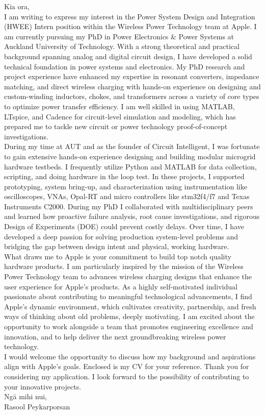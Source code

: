 \documentclass[letterpaper,11pt]{article}
\begin{document}
Kia ora, \\[15pt]
I am writing to express my interest in the Power System Design and Integration (HWEE) Intern position within the Wireless Power Technology team at Apple. I am currently pursuing my PhD in Power Electronics \& Power Systems at Auckland University of Technology. With a strong theoretical and practical background spanning analog and digital circuit design, I have developed a solid technical foundation in power systems and electronics. My PhD research and project experience have enhanced my expertise in resonant converters, impedance matching, and direct wireless charging with hands-on experience on designing and custom-winding inductors, chokes, and transformers across a variety of core types to optimize power transfer efficiency. I am well skilled in using MATLAB, LTspice, and Cadence for circuit-level simulation and modeling, which has prepared me to tackle new circuit or power technology proof-of-concept investigations. \\[10pt]

During my time at AUT and as the founder of Circuit Intelligent, I was fortunate to gain extensive hands-on experience designing and building modular microgrid hardware testbeds. I frequently utilize Python and MATLAB for data collection, scripting, and doing hardware in the loop test. In these projects, I supported prototyping, system bring-up, and characterization using instrumentation like oscilloscopes, VNAs, Opal-RT and micro controllers like stm32f4/f7 and  Texas Instruments C2000. During my PhD I collaborated with multidisciplinary peers and learned how proactive failure analysis, root cause investigations, and rigorous Design of Experiments (DOE) could prevent costly delays. Over time, I have developed a deep passion for solving production system-level problems and bridging the gap between design intent and physical, working hardware.\\[10pt]

What draws me to Apple is your commitment to build top notch quality hardware products. I am particularly inspired by the mission of the Wireless Power Technology team to advances wireless charging designs that enhance the user experience for Apple's products. As a highly self-motivated individual passionate about contributing to meaningful technological advancements, I find Apple's dynamic environment, which cultivates creativity, partnership, and fresh ways of thinking about old problems, deeply motivating. I am excited about the opportunity to work alongside a team that promotes engineering excellence and innovation, and to help deliver the next groundbreaking wireless power technology. \\[10pt]

I would welcome the opportunity to discuss how my background and aspirations align with Apple's goals. Enclosed is my CV for your reference. Thank you for considering my application. I look forward to the possibility of contributing to your innovative projects. \\[25pt]

Ngā mihi nui, \\[10pt]
Rasool Peykarporsan\\[10pt]
\end{document}
